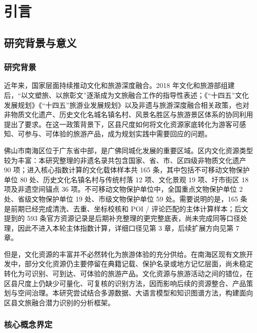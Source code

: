 \chapter{引言}\label{ux5f15ux8a00}

\section{研究背景与意义}\label{ux7814ux7a76ux80ccux666fux4e0eux610fux4e49}

\subsection{研究背景}\label{ux7814ux7a76ux80ccux666f}

近年来，国家层面持续推动文化和旅游深度融合。2018 年文化和旅游部组建后，``以文塑旅、以旅彰文''逐渐成为文旅融合工作的指导性表述；《``十四五''文化发展规划》《``十四五''旅游业发展规划》以及非遗与旅游深度融合相关政策，也对非物质文化遗产、历史文化名城名镇名村、风景名胜区与旅游景区体系的协同利用提出了要求\cite{ref19,ref20,ref21}。在这一政策背景下，区县尺度如何将文化资源家底转化为游客可感知、可参与、可体验的旅游产品，成为规划实践中需要回应的问题。

佛山市南海区位于广东省中部，是广佛同城化发展的重要区域。区内文化资源类型较为丰富：本研究整理的非遗名录共包含国家、省、市、区四级非物质文化遗产 90 项；进入核心指数计算的文化载体样本共 165 条，其中包括不可移动文物保护单位 80 处、历史文化名镇名村与传统村落 12 项、文化景观 19 项、圩市街区 18 项及非遗空间锚点 36 项。不可移动文物保护单位中，全国重点文物保护单位 2 处、省级文物保护单位 19 处、市级文物保护单位 59 处。需要说明的是，165 条是前期已经完成清洗、去重、坐标校核和 POI / 评论匹配的主体计算样本；后文提到的 593 条官方资源记录是后期补充整理的更完整底表，尚未完成同等口径处理，因此不进入本轮主体指数计算，详细口径见第 3 章，后续扩展方向见第 7 章。

但是，文化资源的丰富并不必然转化为旅游体验的充分供给。在南海区现有文旅开发中，部分文化资源仍主要停留在典籍记载、保护名录或地方记忆层面，尚未稳定转化为可识别、可到达、可体验的旅游产品。文化资源与旅游活动之间的错位，在区县尺度上仍缺少可量化、可复核的识别方法，因而影响后续的资源整合、产品策划与空间治理。本研究尝试结合多源数据、大语言模型和知识图谱方法，构建面向区县文旅融合潜力识别的分析框架。

\subsection{核心概念界定}\label{ux6838ux5fc3ux6982ux5ff5ux754cux5b9a}

